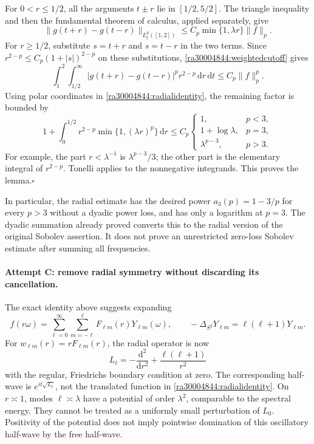 \documentclass[11pt]{article}
\newcommand{\dd}{\,\mathrm d}
\begin{document}
	For $0<r\leq1/2$, all the arguments $t\pm r$ lie in $[1/2,5/2]$.
	The triangle inequality and then the fundamental theorem of calculus,
	applied separately, give
	\[
	\|g(t+r)-g(t-r)\|_{L^p_t([1,2])}
	\leq C_p\min\{1,\lambda r\}\|f\|_p.
	\]
	For $r\geq1/2$, substitute $s=t+r$ and $s=t-r$ in the two terms.
	Since $r^{2-p}\leq C_p(1+|s|)^{2-p}$ on these substitutions,
	\eqref{ra30004844:weightedcutoff} gives
	\[
	\int_1^2\int_{1/2}^{\infty}
	|g(t+r)-g(t-r)|^p r^{2-p}\dd r\dd t
	\leq C_p\|f\|_p^p.
	\]
	Using polar coordinates in \eqref{ra30004844:radialidentity}, the remaining
	factor is bounded by
	\begin{equation}\label{ra30004844:radialintegral}
		1+\int_0^{1/2}r^{2-p}\min\{1,(\lambda r)^p\}\dd r
		\leq C_p
		\begin{cases}
			1,&p<3,\\
			1+\log\lambda,&p=3,\\
			\lambda^{p-3},&p>3.
		\end{cases}
	\end{equation}
	For example, the part $r<\lambda^{-1}$ is
	$\lambda^{p-3}/3$; the other part is the elementary integral of
	$r^{2-p}$. Tonelli applies to the nonnegative integrands. This proves
	the lemma.\hfill$\square$
	
	In particular, the radial estimate has the desired power
	$a_3(p)=1-3/p$ for every $p>3$ without a dyadic power loss, and has only
	a logarithm at $p=3$. The dyadic summation already proved converts this
	to the radial version of the original Sobolev assertion. It does not
	prove an unrestricted zero-loss Sobolev estimate after summing all
	frequencies.
	
	\paragraph{Attempt C: remove radial symmetry without discarding its cancellation.}
	The exact identity above suggests expanding
	\[
	f(r\omega)=\sum_{\ell=0}^{\infty}\sum_{m=-\ell}^{\ell}
	F_{\ell m}(r)Y_{\ell m}(\omega),
	\qquad -\Delta_{S^2}Y_{\ell m}=\ell(\ell+1)Y_{\ell m}.
	\]
	For $w_{\ell m}(r)=rF_{\ell m}(r)$, the radial operator is now
	\begin{equation}\label{ra30004844:angularbarrier}
		L_\ell=-\frac{\mathrm d^2}{\mathrm dr^2}
		+\frac{\ell(\ell+1)}{r^2}
	\end{equation}
	with the regular, Friedrichs boundary condition at zero. The corresponding
	half-wave is $e^{it\sqrt{L_\ell}}$, not the translated function in
	\eqref{ra30004844:radialidentity}. On $r\asymp1$, modes $\ell\asymp\lambda$
	have a potential of order $\lambda^2$, comparable to the spectral energy.
	They cannot be treated as a uniformly small perturbation of $L_0$.
	Positivity of the potential does not imply pointwise domination of this
	oscillatory half-wave by the free half-wave.
	
\end{document}
